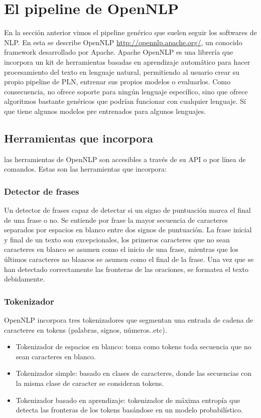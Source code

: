 \section{El pipeline de OpenNLP}
En la sección anterior vimos el pipeline genérico que suelen seguir los softwares de NLP. En esta se describe OpenNLP \url{http://opennlp.apache.org/}, un conocido framework desarrollado por Apache.\newline
Apache OpenNLP es una librería que incorpora un kit de herramientas basadas en aprendizaje automático para hacer procesamiento del texto en lenguaje natural, permitiendo al usuario crear su propio pipeline de PLN, entrenar sus propios modelos o evaluarlos. Como consecuencia, no ofrece soporte para ningún lenguaje específico, sino que ofrece algoritmos bastante genéricos que podrían funcionar con cualquier lenguaje. Sí que tiene algunos modelos pre entrenados para algunos lenguajes. 
\subsection{Herramientas que incorpora}
las herramientas de OpenNLP son accesibles a través de su API o por línea de comandos. Estas son las herramientas que incorpora:
\subsubsection{Detector de frases} 
Un detector de frases capaz de detectar si un signo de puntuación marca el final de una frase o no. Se entiende por frase la mayor secuencia de caracteres separados por espacios en blanco entre dos signos de puntuación. La frase inicial y final de un texto son excepcionales, los primeros caracteres que no sean caracteres en blanco se asumen como el inicio de una frase, mientras que los últimos caracteres no blancos se asumen como el final de la frase. Una vez que se han detectado correctamente las fronteras de las oraciones, se formatea el texto debidamente. 
\subsubsection{Tokenizador}
OpenNLP incorpora tres tokenizadores que segmentan una entrada de cadena de caracteres en tokens (palabras, signos, números..etc).
\begin{itemize}
\item Tokenizador de espacios en blanco: toma como tokens toda secuencia que no sean caracteres en blanco.
\item Tokenizador simple: basado en clases de caracteres, donde las secuencias con la misma clase de caracter se consideran tokens. 
\item Tokenizador basado en aprendizaje: tokenizador de máxima entropía que detecta las fronteras de los tokens basándose en un modelo probabilístico. 
\end{itemize}
